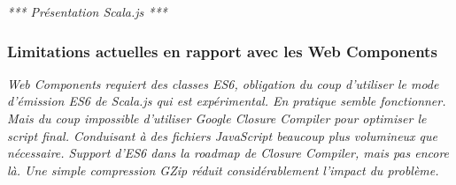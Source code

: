 \textit{*** Présentation Scala.js ***}

\subsubsection{Limitations actuelles en rapport avec les Web Components}

\textit{Web Components requiert des classes ES6, obligation du coup d'utiliser le mode d'émission ES6 de Scala.js qui est expérimental. En pratique semble fonctionner. Mais du coup impossible d'utiliser Google Closure Compiler pour optimiser le script final. Conduisant à des fichiers JavaScript beaucoup plus volumineux que nécessaire. Support d'ES6 dans la roadmap de Closure Compiler, mais pas encore là. Une simple compression GZip réduit considérablement l'impact du problème.}